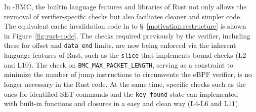 In \projname{}-BMC, the builtin language features and libraries of Rust not
    only allows the revmoval of verifier-specific checks but also faciliates
    cleaner and simpler code.
The equivalent cache invalidation code in \projname{} to
    \S~\ref{motivation:restructure} is shown in Figure~\ref{fig:rust-code}.
The checks required previously by the verifier, including these for offset and
    \texttt{data\_end} limits, are now being enforced via the inherent language
    features of Rust, such as the \texttt{slice} that implements bound checks
    (L2 and L10).
The check on \texttt{BMC\_MAX\_PACKET\_LENGTH}, serving as a constraint to minimize the number
    of jump instructions to circumvente the eBPF verifier, is no longer necessary
    in the Rust code.
At the same time, specific checks such as the ones for identified SET commands
    and the \texttt{key\_found} state can implemented with built-in
    functions and closures in a easy and clean way (L4-L6 and L11).


